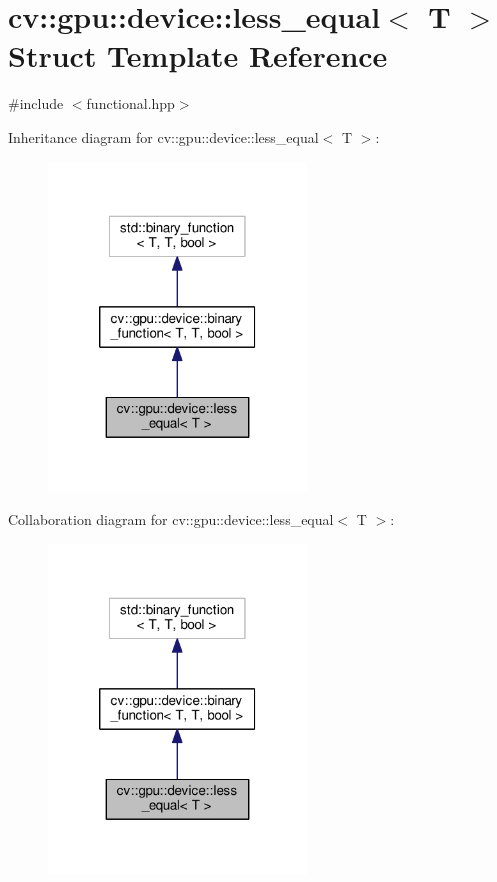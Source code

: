 \hypertarget{structcv_1_1gpu_1_1device_1_1less__equal}{\section{cv\-:\-:gpu\-:\-:device\-:\-:less\-\_\-equal$<$ T $>$ Struct Template Reference}
\label{structcv_1_1gpu_1_1device_1_1less__equal}
}


{\ttfamily \#include $<$functional.\-hpp$>$}



Inheritance diagram for cv\-:\-:gpu\-:\-:device\-:\-:less\-\_\-equal$<$ T $>$\-:\nopagebreak
\begin{figure}[H]
\begin{center}
\leavevmode
\includegraphics[width=194pt]{structcv_1_1gpu_1_1device_1_1less__equal__inherit__graph}
\end{center}
\end{figure}


Collaboration diagram for cv\-:\-:gpu\-:\-:device\-:\-:less\-\_\-equal$<$ T $>$\-:\nopagebreak
\begin{figure}[H]
\begin{center}
\leavevmode
\includegraphics[width=194pt]{structcv_1_1gpu_1_1device_1_1less__equal__coll__graph}
\end{center}
\end{figure}
